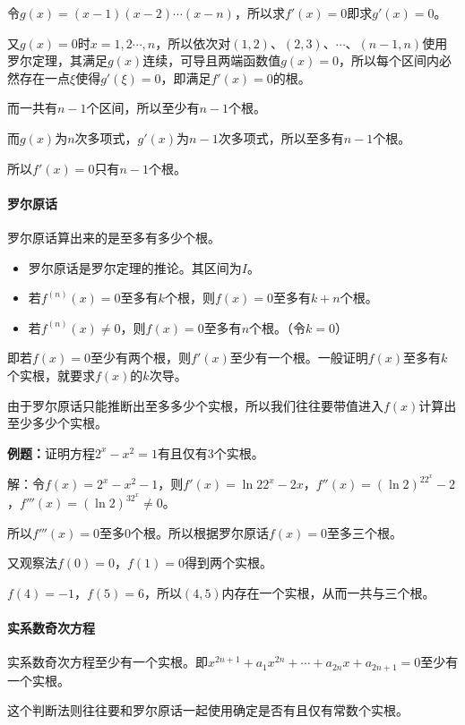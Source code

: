 令$g(x)=(x-1)(x-2)\cdots(x-n)$，所以求$f'(x)=0$即求$g'(x)=0$。

又$g(x)=0$时$x=1,2\cdots,n$，所以依次对$(1,2)$、$(2,3)$、$\cdots$、$(n-1,n)$使用罗尔定理，其满足$g(x)$连续，可导且两端函数值$g(x)=0$，所以每个区间内必然存在一点$\xi$使得$g'(\xi)=0$，即满足$f'(x)=0$的根。

而一共有$n-1$个区间，所以至少有$n-1$个根。

而$g(x)$为$n$次多项式，$g'(x)$为$n-1$次多项式，所以至多有$n-1$个根。

所以$f'(x)=0$只有$n-1$个根。

\paragraph{罗尔原话} \leavevmode \medskip

罗尔原话算出来的是至多有多少个根。

\begin{itemize}
    \item 罗尔原话是罗尔定理的推论。其区间为$I$。
    \item 若$f^{(n)}(x)=0$至多有$k$个根，则$f(x)=0$至多有$k+n$个根。
    \item 若$f^{(n)}(x)\neq0$，则$f(x)=0$至多有$n$个根。（令$k=0$）
\end{itemize}

即若$f(x)=0$至少有两个根，则$f'(x)$至少有一个根。一般证明$f(x)$至多有$k$个实根，就要求$f(x)$的$k$次导。

由于罗尔原话只能推断出至多多少个实根，所以我们往往要带值进入$f(x)$计算出至少多少个实根。

\textbf{例题：}证明方程$2^x-x^2=1$有且仅有3个实根。

解：令$f(x)=2^x-x^2-1$，则$f'(x)=\ln22^x-2x$，$f''(x)=(\ln2)^22^x-2$，$f'''(x)=(\ln2)^32^x\neq 0$。

所以$f'''(x)=0$至多0个根。所以根据罗尔原话$f(x)=0$至多三个根。

又观察法$f(0)=0$，$f(1)=0$得到两个实根。

$f(4)=-1$，$f(5)=6$，所以$(4,5)$内存在一个实根，从而一共与三个根。

\paragraph{实系数奇次方程} \leavevmode \medskip

实系数奇次方程至少有一个实根。即$x^{2n+1}+a_1x^{2n}+\cdots+a_{2n}x+a_{2n+1}=0$至少有一个实根。

这个判断法则往往要和罗尔原话一起使用确定是否有且仅有常数个实根。

